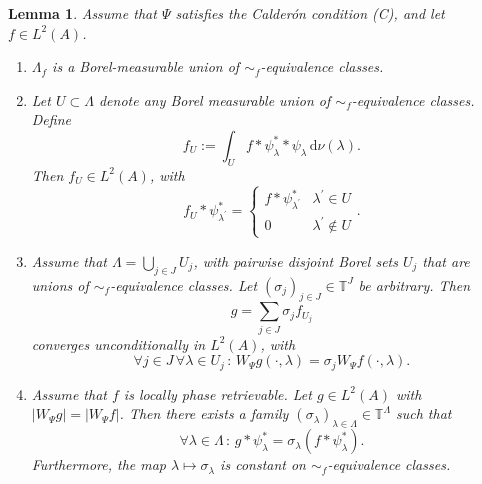 \documentclass[10pt,a4paper]{amsart}
\newtheorem{lemma}{Lemma}
\newcommand{\T}{\mathbb{T}}
\newcommand{\dnu}{\,\mathrm{d}\nu}
\begin{document}
\begin{lemma}\label{lem:local_global}
	Assume that $\Psi$ satisfies the Calder\'on condition \textup{(C)}, and let $f \in L^2(A)$. 
	\begin{enumerate}
		\item[(a)] $\Lambda_f$ is a Borel-measurable union of $\sim_f$-equivalence classes. 
		\item[(b)] Let $U \subset \Lambda$ denote any Borel measurable union of $\sim_f$-equivalence classes. Define 
		\[
		f_U := \int_U f \ast \psi_\lambda^* \ast \psi_\lambda \dnu(\lambda). 
		\]
		Then $f_U \in L^2(A)$, with 
		\[
		f_U \ast \psi_{\lambda^\prime}^* = \begin{cases}
			f \ast \psi_{\lambda^\prime}^* & \lambda^\prime \in U \\ 0 & \lambda^\prime \not \in U
		\end{cases}.
		\]
		\item[(c)] Assume that $\Lambda = \bigcup_{j \in J} U_j$, with pairwise disjoint Borel sets $U_j$ that are unions of $\sim_f$-equivalence classes. Let $(\sigma_j)_{j \in J} \in \T^J$ be arbitrary. Then 
		\[
		g = \sum_{j \in J} \sigma_j f_{U_j} 
		\] converges unconditionally in $L^2(A)$, with 
		\begin{equation} \label{eqn:changesign}
			\forall j \in J \,\forall \lambda \in U_j\,:\,  W_\Psi g(\cdot,\lambda) = \sigma_j W_\Psi f (\cdot,\lambda).
		\end{equation}
		\item[(d)] Assume that $f$ is locally phase retrievable. Let $g \in L^2(A)$ with $|W_\Psi g| = |W_\Psi f|$. Then there exists a family $(\sigma_{\lambda})_{\lambda \in \Lambda} \in \T^{\Lambda}$ such that 
		\[
		\forall \lambda \in \Lambda \,:\, g \ast \psi_{\lambda}^* = \sigma_{\lambda} (f \ast \psi_{\lambda}^*).
		\] 
		Furthermore, the map $\lambda \mapsto \sigma_\lambda$ is constant on $\sim_f$-equivalence classes. 
	\end{enumerate}
\end{lemma}
\end{document}
